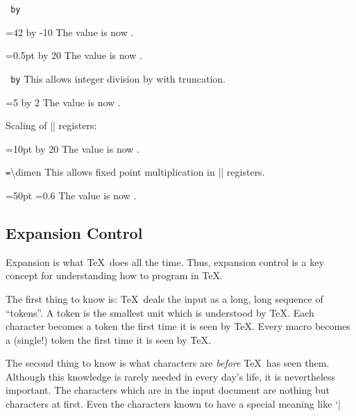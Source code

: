 \begin{command}{\multiply{}\texttt{ by}}
\begin{codeexample}[]
=42
\multiply{} by -10
The value is now \the{}.
\end{codeexample}

\begin{codeexample}[]
=0.5pt
\multiply{} by 20
The value is now \the{}.
\end{codeexample}
\end{command}

\begin{command}{\divide{}\texttt{ by}}
	This allows integer division by  with truncation.
\begin{codeexample}[]
=5
\divide{} by 2
The value is now \the{}.
\end{codeexample}

	Scaling of |\dimen| registers:
\begin{codeexample}[]
=10pt
\divide{} by 20
The value is now \the{}.
\end{codeexample}
\end{command}

\begin{command}{\dimen{}\texttt{=}\textbackslash dimen}
	This allows fixed point multiplication in |\dimen| registers.
\begin{codeexample}[]
=50pt
=0.6
The value is now \the{}.
\end{codeexample}
\end{command}


\subsection{Expansion Control}
\label{sec:expansion:control}
Expansion is what \TeX\ does all the time. Thus, expansion control is a key concept for understanding how to program in \TeX.

The first thing to know is: \TeX\ deals the input as a long, long sequence of ``tokens''. A token is the smallest unit which is understood by \TeX. Each character becomes a token the first time it is seen by \TeX. Every macro becomes a (single!) token the first time it is seen by \TeX.

The second thing to know is what characters are \emph{before} \TeX\ has seen them. Although this knowledge is rarely needed in every day's life, it is nevertheless important. The characters which are in the input document are nothing but characters at first. Even the characters known to have a special meaning like `|%

